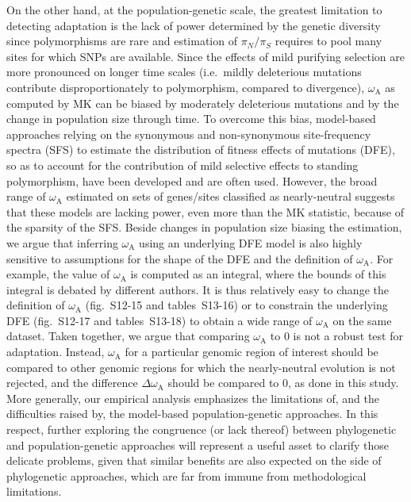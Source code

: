 \documentclass{article}
\newcommand{\rateApop}{\omega_{\mathrm{A}}}
\newcommand{\pn}{\pi_N}
\newcommand{\ps}{\pi_S}
\newcommand{\pnps}{\pn / \ps}
\begin{document}
    On the other hand, at the population-genetic scale, the greatest limitation to detecting adaptation is the lack of power determined by the genetic diversity since polymorphisms are rare and estimation of $\pnps$ requires to pool many sites for which SNPs are available.
    Since the effects of mild purifying selection are more pronounced on longer time scales (i.e.~mildly deleterious mutations contribute disproportionately to polymorphism, compared to divergence), $\rateApop$ as computed by MK can be biased by moderately deleterious mutations\cite{eyre-walker_quantifying_2002, ho_time_2005} and by the change in population size through time\cite{eyre-walker_changing_2002}.
    To overcome this bias, model-based approaches relying on the synonymous and non-synonymous site-frequency spectra (SFS) to estimate the distribution of fitness effects of mutations (DFE), so as to account for the contribution of mild selective effects to standing polymorphism, have been developed\cite{eyre-walker_estimating_2009, tataru_polydfe_2020} and are often used\cite{galtier_adaptive_2016, moutinho_variation_2019}.
    However, the broad range of $\rateApop$ estimated on sets of genes/sites classified as nearly-neutral suggests that these models are lacking power, even more than the MK statistic, because of the sparsity of the SFS.
    Beside changes in population size biasing the estimation\cite{rousselle_overestimation_2018}, we argue that inferring $\rateApop$ using an underlying DFE model is also highly sensitive to assumptions for the shape of the DFE and the definition of $\rateApop$.
    For example, the value of $\rateApop$ is computed as an integral, where the bounds of this integral is debated by different authors\cite{galtier_adaptive_2016, tataru_polydfev2_2019}.
    It is thus relatively easy to change the definition of $\rateApop$ (fig.~S12-15 and tables~S13-16) or to constrain the underlying DFE (fig.~S12-17 and tables~S13-18) to obtain a wide range of $\rateApop$ on the same dataset.
    Taken together, we argue that comparing $\rateApop$ to 0 is not a robust test for adaptation.
    Instead, $\rateApop$ for a particular genomic region of interest should be compared to other genomic regions for which the nearly-neutral evolution is not rejected, and the difference $\Delta \rateApop$ should be compared to 0, as done in this study.
    More generally, our empirical analysis emphasizes the limitations of, and the difficulties raised by, the model-based population-genetic approaches.
    In this respect, further exploring the congruence (or lack thereof) between phylogenetic and population-genetic approaches will represent a useful asset to clarify those delicate problems, given that similar benefits are also expected on the side of phylogenetic approaches, which are far from immune from methodological limitations.
\end{document}
